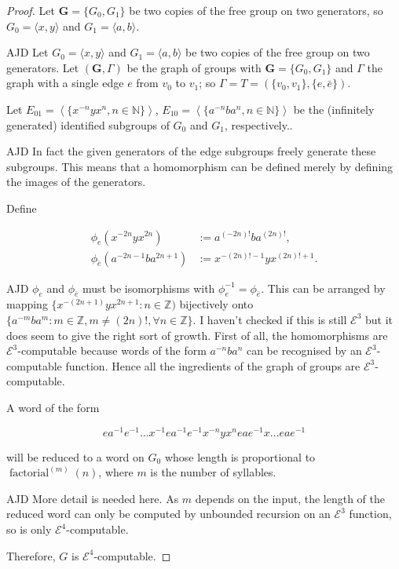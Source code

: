 \documentclass[a4paper]{article}
\newcommand{\grz}[1]{$\mathcal{E}^{#1}$}	%
\theoremstyle{plain}
\theoremstyle{definition}
\newenvironment{ad}{\noindent\color{green} AJD }{}
\newcommand{\ajd}[1]{
\begin{ad} #1 \end{ad}}
\begin{document}
\begin{proof}
Let $\mathbf{G} = \{G_0,G_1\}$ be two copies of the free group on two generators, so $G_0 = \langle x,y \rangle$ and $G_1 = \langle a,b \rangle$. 
\ajd{Let $G_0 = \langle x,y \rangle$ and $G_1 = \langle a,b \rangle$  
be two copies of the free group on two generators. Let $(\mathbf{G},\Gamma)$
 be the graph of groups with $\mathbf{G} = \{G_0,G_1\}$ and $\Gamma$ the 
graph
with a single edge $e$ from $v_0$ to $v_1$; so $\Gamma = T = (\{v_0,v_1\},\{e,\bar{e}\})$.}

Let $E_{01} = \left \langle \{x^{-n}yx^n, n \in \mathbb{N} \} \right \rangle$, $E_{10} = \left\langle \{ a^{-n}ba^n, n \in \mathbb{N} \} \right\rangle$ be the (infinitely generated) identified subgroups of $G_0$ and $G_1$, respectively..
\ajd{In fact the given generators of the edge subgroups freely generate
these subgroups. This means that a homomorphism can be defined merely
by defining the images of the generators.}

Define

\begin{align*} 
	\phi_{e}(x^{-2n}yx^{2n}) &:= a^{(-2n)!}ba^{(2n)!}, \\
	\phi_{\bar{e}}(a^{-2n-1}ba^{2n+1}) &:= x^{-(2n)!-1}yx^{(2n)!+1}. 
\end{align*} 
\ajd{$\phi_e$ and $\phi_{\bar{e}}$ must be isomorphisms with 
$\phi_e^{-1}=\phi_{\bar{e}}$. This can be arranged by mapping 
$\{x^{-(2n+1)}y x^{2n+1}:n\in \mathbb{Z)}$ bijectively onto $\{a^{-m}ba^m:m\in \mathbb{Z}, 
m\neq (2n)!, \forall n\in \mathbb{Z}\}$. I haven't checked if this
is still \grz{3} but it does seem to give the right sort of growth. 
} 
First of all, the homomorphisms are \grz{3}-computable because words of the form $a^{-n}ba^n$ can be recognised by an \grz{3}-computable function. Hence all the ingredients of the graph of groups are \grz{3}-computable.

A word of the form

\[ ea^{-1}e^{-1} \dots x^{-1}ea^{-1}e^{-1}x^{-n}yx^neae^{-1}x \dots eae^{-1} \]

will be reduced to a word on $G_0$ whose length is proportional to $\operatorname{factorial}^{(m)}(n)$, where $m$ is the number of syllables. 
\ajd{More detail is needed here.} 
As $m$ depends on the input, the length of the reduced word can only be computed by unbounded recursion on an \grz{3} function, so is only \grz{4}-computable.

Therefore, $G$ is \grz{4}-computable. 
\end{proof}
\end{document}
